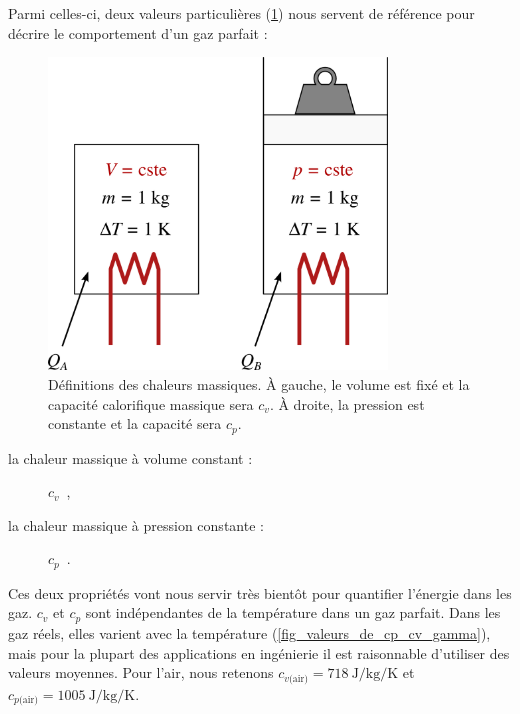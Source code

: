 		Parmi celles-ci, deux valeurs particulières (\cref{fig_cp_et_cv}) nous servent de référence pour décrire le comportement d’un gaz parfait :

		\begin{figure}
			\begin{center}
				\includegraphics[width=9cm]{images/capacites_calorifiques.png}
			\end{center}
			\caption{Définitions des chaleurs massiques. À gauche, le volume est fixé et la capacité calorifique massique sera $c_v$. À droite, la pression est constante et la capacité sera $c_p$.}
			\label{fig_cp_et_cv}
		\end{figure}
		
		\begin{description}
			\item[la chaleur massique à volume constant :]$c_v$~, \dontbreakpage
			\item[la chaleur massique à pression constante :]$c_p$~.
		\end{description}

		Ces deux propriétés vont nous servir très bientôt pour quantifier l’énergie dans les gaz. $c_v$ et $c_p$ sont indépendantes de la température dans un gaz parfait. Dans les gaz réels, elles varient avec la température (\cref{fig_valeurs_de_cp_cv_gamma}), mais pour la plupart des applications en ingénierie il est raisonnable d’utiliser des valeurs moyennes. Pour l’air, nous retenons $c_{v\text{(air)}} = \SI{718}{\joule\per\kilogram\per\kelvin}$ et $c_{p\text{(air)}} = \SI{1005}{\joule\per\kilogram\per\kelvin}$.

